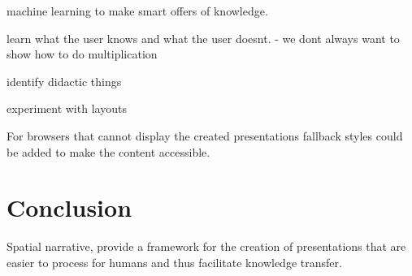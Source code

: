 \documentclass[twoside, 12pt]{article}
\newcommand{\sys}{\textsc{RPresentation}\xspace}
\begin{document}

machine learning to make smart offers of knowledge. 

learn what the user knows and what the user doesnt. - we dont always want to show how to do multiplication

identify didactic things

experiment with layouts


For browsers that cannot display the created presentations fallback styles could be added to make the content accessible.


\section{Conclusion}
\label{sec:conclusion}
Spatial narrative, provide a framework for the creation of presentations that are easier to process for humans and thus facilitate knowledge transfer.\\




\newpage

{}

\end{document}
